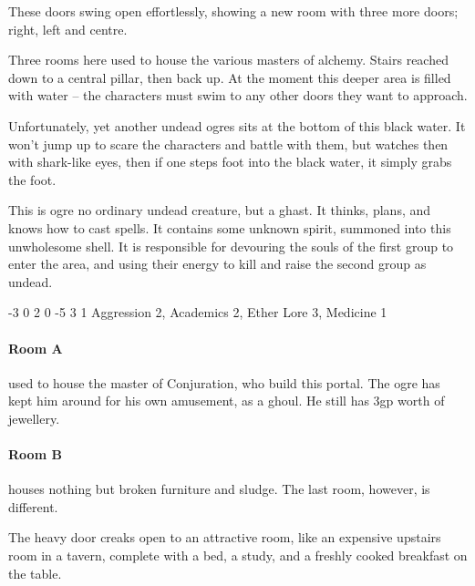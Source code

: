 \begin{multicols}{2}
\begin{enumerate}
\end{enumerate}


\begin{boxtext}
  These doors swing open effortlessly, showing a new room with three more doors; right, left and centre.

\end{boxtext}

Three rooms here used to house the various masters of alchemy.  Stairs reached down to a central pillar, then back up.  At the moment this deeper area is filled with water -- the characters must swim to any other doors they want to approach.

Unfortunately, yet another undead ogres sits at the bottom of this black water.  It won't jump up to scare the characters and battle with them, but watches then with shark-like eyes, then if one steps foot into the black water, it simply grabs the foot.

This is ogre no ordinary undead creature, but a ghast.
It thinks, plans, and knows how to cast spells.
It contains some unknown spirit, summoned into this unwholesome shell.
It is responsible for devouring the souls of the first group to enter the area, and using their energy to kill and raise the second group as undead.

\label{undead_ogre}

  {-3}%
  {0}%
  {{2}%
  {0}%
  {-5}}%
  {3}%
  {1}%
  {Aggression 2, Academics 2, Ether Lore 3, Medicine 1}%
  {\longsword}%
  {\addtocounter{xpbonus}{3}}

\paragraph{Room A} used to house the master of Conjuration, who build this portal.
The ogre has kept him around for his own amusement, as a ghoul.
He still has 3gp worth of jewellery.

\paragraph{Room B} houses nothing but broken furniture and sludge.  The last room, however, is different.

\begin{boxtext}
  The heavy door creaks open to an attractive room, like an expensive upstairs room in a tavern, complete with a bed, a study, and a freshly cooked breakfast on the table.
\end{boxtext}


\end{multicols}
